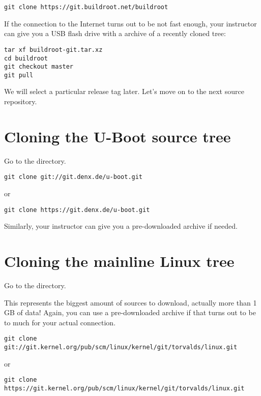 \begin{verbatim}
git clone https://git.buildroot.net/buildroot
\end{verbatim}

If the connection to the Internet turns out to be not fast enough,
your instructor can give you a USB flash drive with a
 archive of a recently cloned tree:

\begin{verbatim}
tar xf buildroot-git.tar.xz
cd buildroot
git checkout master
git pull
\end{verbatim}

We will select a particular release tag later. Let's move on to the next
source repository.

\section{Cloning the U-Boot source tree}

Go to the  directory.

\begin{verbatim}
git clone git://git.denx.de/u-boot.git
\end{verbatim}

or

\begin{verbatim}
git clone https://git.denx.de/u-boot.git
\end{verbatim}

Similarly, your instructor can give you a pre-downloaded archive if
needed.

\section{Cloning the mainline Linux tree}

Go to the  directory.

This represents the biggest amount of sources to download, actually more
than 1 GB of data! Again, you can use a pre-downloaded archive if that
turns out to be to much for your actual connection.

\begin{verbatim}
git clone git://git.kernel.org/pub/scm/linux/kernel/git/torvalds/linux.git
\end{verbatim}

or

\begin{verbatim}
git clone https://git.kernel.org/pub/scm/linux/kernel/git/torvalds/linux.git
\end{verbatim}

